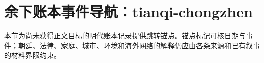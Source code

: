 \section{余下账本事件导航：tianqi-chongzhen}

\label{sec:remaining-event-anchors-tianqi-chongzhen}

本节为尚未获得正文目标的明代账本记录提供跳转锚点。锚点标记可核日期与事件；朝廷、法律、家庭、城市、环境和海外网络的解释仍应由各条来源和已有叙事的材料界限约束。
